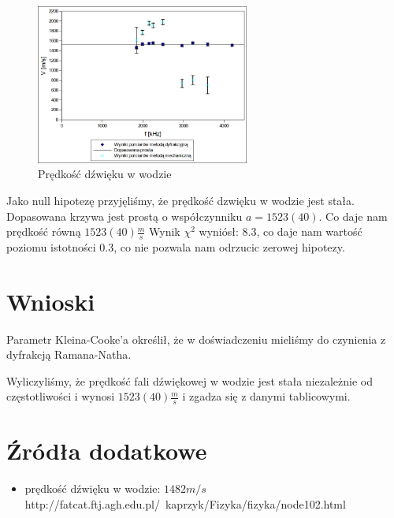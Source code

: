 \documentclass[a4paper,12pt]{article}
\begin{document}
\begin{figure} [H]
  \begin{center}
    \includegraphics[width = 7cm]{wykres5.png}
    \caption{Prędkość dźwięku w wodzie}
  \end{center}
\end{figure}


Jako null hipotezę przyjęliśmy, że prędkość dzwięku w wodzie jest stała. Dopasowana krzywa jest prostą o współczynniku $a=1523(40)$. Co daje nam prędkość równą $1523(40) \frac{m}{s}$
Wynik $\chi^2$ wyniósł: 8.3, co daje nam wartość poziomu istotności 0.3, co nie pozwala nam odrzucic zerowej hipotezy.

\section{Wnioski}


Parametr Kleina-Cooke'a określił, że w doświadczeniu mieliśmy do czynienia z dyfrakcją Ramana-Natha. 

Wyliczyliśmy, że prędkość fali dźwiękowej w wodzie jest stała niezależnie od częstotliwości i wynosi $1523(40) \frac{m}{s}$ i zgadza się z danymi tablicowymi.


\section {Źródła dodatkowe}
  
 \begin{itemize}
   \item prędkość dźwięku w wodzie: $ 1482 m/s$ \\ http://fatcat.ftj.agh.edu.pl/~kaprzyk/Fizyka/fizyka/node102.html
   
 \end{itemize}
\end{document}
